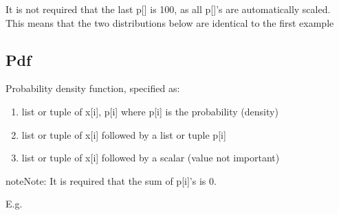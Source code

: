 \documentclass[letterpaper,10pt,english]{sphinxmanual}
\begin{document}
It is not required that the last p{[}{]} is 100, as all p{[}{]}’s are automatically scaled. This means that the two distributions below are
identical to the first example

\begin{sphinxVerbatim}[commandchars=\\\{\}]
           
                      
\end{sphinxVerbatim}


\subsection{Pdf}
\label{\detokenize{Distributions:pdf}}
Probability density function, specified as:
\begin{enumerate}
\item {} 
list or tuple of x{[}i{]}, p{[}i{]} where p{[}i{]} is the probability (density)

\item {} 
list or tuple of x{[}i{]} followed by a list or tuple p{[}i{]}

\item {} 
list or tuple of x{[}i{]} followed by a scalar (value not important)

\end{enumerate}

\begin{sphinxadmonition}{note}{Note:}
It is required that the sum of p{[}i{]}’s is  0.
\end{sphinxadmonition}

E.g.

\begin{sphinxVerbatim}[commandchars=\\\{\}]
       
\end{sphinxVerbatim}
\end{document}
